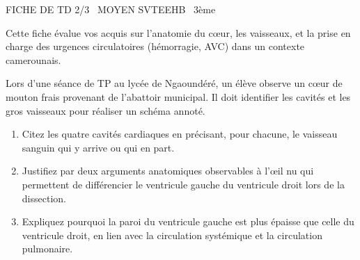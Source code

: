 \documentclass[11pt]{article}
\begin{document}
\begin{tcolorbox}[enhanced,colback=popink,colframe=popink,arc=10pt,boxrule=0pt,left=12pt,right=12pt,top=9pt,bottom=9pt]
{\color{white}\popxbold\small FICHE DE TD 2/3 \textbullet\ MOYEN \hfill SVTEEHB \textbullet\ 3ème\par}
\end{tcolorbox}
\vspace{4pt}
Cette fiche évalue vos acquis sur l'anatomie du cœur, les vaisseaux, et la prise en charge des urgences circulatoires (hémorragie, AVC) dans un contexte camerounais.

\begin{exercice}
Lors d'une séance de TP au lycée de Ngaoundéré, un élève observe un cœur de mouton frais provenant de l'abattoir municipal. Il doit identifier les cavités et les gros vaisseaux pour réaliser un schéma annoté.
\begin{enumerate}
    \item Citez les quatre cavités cardiaques en précisant, pour chacune, le vaisseau sanguin qui y arrive ou qui en part.
    \item Justifiez par deux arguments anatomiques observables à l'œil nu qui permettent de différencier le ventricule gauche du ventricule droit lors de la dissection.
    \item Expliquez pourquoi la paroi du ventricule gauche est plus épaisse que celle du ventricule droit, en lien avec la circulation systémique et la circulation pulmonaire.
\end{enumerate}
\end{exercice}
\end{document}
